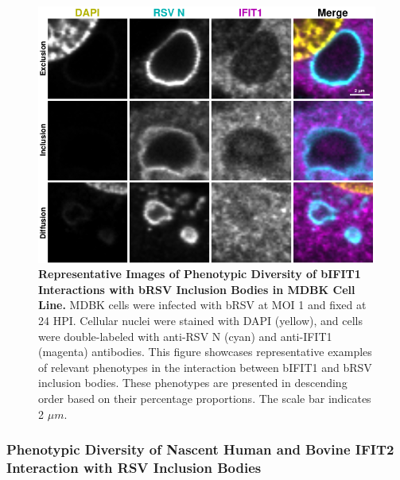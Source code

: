 \begin{figure}
    \centering
    \includegraphics[width=1\linewidth]{08. Chapter 3/Figs/02. Infection/01. IFIT1/09. mdbk i1.pdf}
    \caption[Representative Images of Phenotypic Diversity of bIFIT1 Interactions with bRSV Inclusion Bodies in MDBK Cell Line.]{\textbf{Representative Images of Phenotypic Diversity of bIFIT1 Interactions with bRSV Inclusion Bodies in MDBK Cell Line.} MDBK cells were infected with bRSV at MOI 1 and fixed at 24 HPI. Cellular nuclei were stained with DAPI (yellow), and cells were double-labeled with anti-RSV N (cyan) and anti-IFIT1 (magenta) antibodies. This figure showcases representative examples of relevant phenotypes in the interaction between bIFIT1 and bRSV inclusion bodies. These phenotypes are presented in descending order based on their percentage proportions. The scale bar indicates 2 \(\mu m\).}
    \label{fig:Representative Images of Phenotypic Diversity of bIFIT1 Interactions with bRSV Inclusion Bodies in MDBK Cell Line}
\end{figure}

\subsubsection{Phenotypic Diversity of Nascent Human and Bovine IFIT2 Interaction with RSV Inclusion Bodies}

